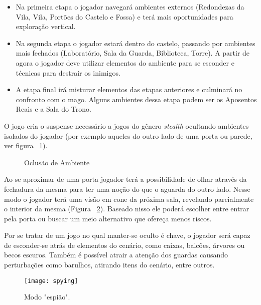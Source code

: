 \begin{itemize}
	\item Na primeira etapa o jogador navegará ambientes externos (Redondezas da Vila, Vila, Portões do Castelo e Fossa) e terá mais oportunidades para exploração vertical.

	\item Na segunda etapa o jogador estará dentro do castelo, passando por ambientes mais fechados (Laboratório, Sala da Guarda, Biblioteca, Torre). A partir de agora o jogador deve utilizar elementos do ambiente para se esconder e técnicas para destrair os inimigos.

	\item A etapa final irá misturar elementos das etapas anteriores e culminará no confronto com o mago. Alguns ambientes dessa etapa podem ser os Aposentos Reais e a Sala do Trono.  
\end{itemize}

O jogo cria o suspense necessário a jogos do gênero \emph{stealth} ocultando ambientes isolados do jogador (por exemplo aqueles do outro lado de uma porta ou parede, ver figura ~\ref{visionmode}). 

	\begin{figure}[h]
		\center
		\qquad
		\caption{Oclusão de Ambiente}
		\label{visionmode}
	\end{figure}

Ao se aproximar de uma porta jogador terá a possibilidade de olhar através da fechadura da mesma para ter uma noção do que o aguarda do outro lado. Nesse modo o jogador terá uma visão em cone da próxima sala, revelando parcialmente o interior da mesma (Figura ~\ref{spy}). Baseado nisso ele poderá escolher entre entrar pela porta ou buscar um meio alternativo que ofereça menos riscos.

Por se tratar de um jogo no qual manter-se oculto é chave, o jogador será capaz de esconder-se atrás de elementos do cenário, como caixas, balcões, árvores ou becos escuros. Também é possível atrair a atenção dos guardas causando perturbações como barulhos, atirando itens do cenário, entre outros.

	\begin{figure}[h!]
		\center
		\texttt{[image: spying]}
		\caption{Modo "espião".}
		\label{spy}
	\end{figure}

